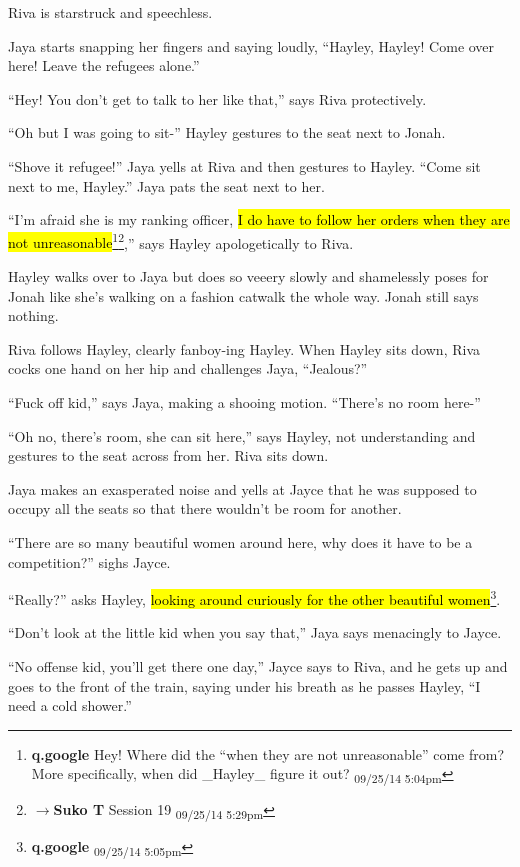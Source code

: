 Riva is starstruck and speechless.

Jaya starts snapping her fingers and saying loudly, ``Hayley, Hayley!  Come over here!  Leave the refugees alone.''

``Hey!  You don't get to talk to her like that,'' says Riva protectively.

``Oh but I was going to sit-'' Hayley gestures to the seat next to Jonah. 

``Shove it refugee!'' Jaya yells at Riva and then gestures to Hayley. ``Come sit next to me, Hayley.''  Jaya pats the seat next to her.

``I'm afraid she is my ranking officer, \hl{I do have to follow her orders when they are not unreasonable}\footnote{\textbf{q.google }Hey!  Where did the ``when they are not unreasonable'' come from?  More specifically, when did \_Hayley\_ figure it out? \textsubscript{09/25/14 5:04pm}}\footnote{$\rightarrow$\textbf{Suko T }Session 19 \textsubscript{09/25/14 5:29pm}},'' says Hayley apologetically to Riva.

Hayley walks over to Jaya but does so veeery slowly and shamelessly poses for Jonah like she's walking on a fashion catwalk the whole way.  Jonah still says nothing.



Riva follows Hayley, clearly fanboy-ing Hayley.  When Hayley sits down, Riva cocks one hand on her hip and challenges Jaya, ``Jealous?''

``Fuck off kid,'' says Jaya, making a shooing motion.  ``There's no room here-''

``Oh no, there's room, she can sit here,'' says Hayley, not understanding and gestures to the seat across from her.  Riva sits down.  

Jaya makes an exasperated noise and yells at Jayce that he was supposed to occupy all the seats so that there wouldn't be room for another.

``There are so many beautiful women around here, why does it have to be a competition?'' sighs Jayce.

``Really?'' asks Hayley, \hl{looking around curiously for the other beautiful women}\footnote{\textbf{q.google } \textsubscript{09/25/14 5:05pm}}.

``Don't look at the little kid when you say that,'' Jaya says menacingly to Jayce.

``No offense kid, you'll get there one day,'' Jayce says to Riva, and he gets up and goes to the front of the train, saying under his breath as he passes Hayley, ``I need a cold shower.''

